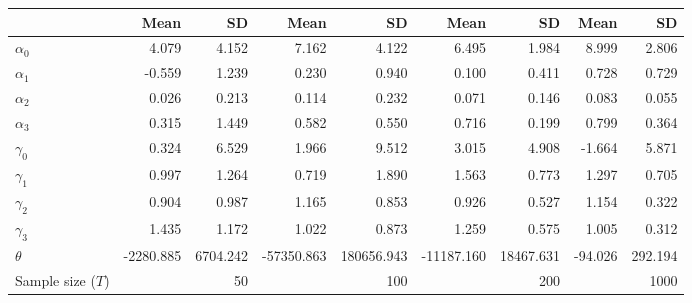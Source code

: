 
\begin{tabular}[t]{lrrrrrrrr}
\toprule
  & Mean & SD & Mean  & SD  & Mean   & SD   & Mean    & SD   \\
\midrule
$\alpha_{0}$ & 4.079 & 4.152 & 7.162 & 4.122 & 6.495 & 1.984 & 8.999 & 2.806\\
$\alpha_{1}$ & -0.559 & 1.239 & 0.230 & 0.940 & 0.100 & 0.411 & 0.728 & 0.729\\
$\alpha_{2}$ & 0.026 & 0.213 & 0.114 & 0.232 & 0.071 & 0.146 & 0.083 & 0.055\\
$\alpha_{3}$ & 0.315 & 1.449 & 0.582 & 0.550 & 0.716 & 0.199 & 0.799 & 0.364\\
$\gamma_{0}$ & 0.324 & 6.529 & 1.966 & 9.512 & 3.015 & 4.908 & -1.664 & 5.871\\
$\gamma_{1}$ & 0.997 & 1.264 & 0.719 & 1.890 & 1.563 & 0.773 & 1.297 & 0.705\\
$\gamma_{2}$ & 0.904 & 0.987 & 1.165 & 0.853 & 0.926 & 0.527 & 1.154 & 0.322\\
$\gamma_{3}$ & 1.435 & 1.172 & 1.022 & 0.873 & 1.259 & 0.575 & 1.005 & 0.312\\
$\theta$ & -2280.885 & 6704.242 & -57350.863 & 180656.943 & -11187.160 & 18467.631 & -94.026 & 292.194\\
Sample size ($T$) &  & 50 &  & 100 &  & 200 &  & 1000\\
\bottomrule
\end{tabular}
